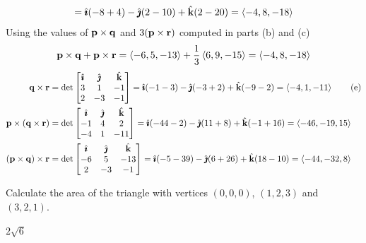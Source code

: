 \begin{solution}
\begin{align*}
=\hat{\pmb{\imath}}(-8+4)-\hat{\pmb{\jmath}}(2-10)
+\hat{\mathbf{k}}(2-20) 
=  \left< -4,8,-18\right> 
\end{align*}
{\phantom{(d)}}
Using the values of $\mathbf{p}\times\mathbf{q}$ and $3(\mathbf{p}\times\mathbf{r})$ computed
in parts (b) and (c)
\begin{equation*}
\mathbf{p}\times\mathbf{q}+\mathbf{p}\times\mathbf{r}=\left< -6,5,-13\right> +\frac{1}{3}\left< 6,9,-15\right> 
 = \left< -4,8,-18\right>
\end{equation*}
\begin{align}
\vq\times\vr 
&= \det\left[\begin{matrix}\hi&\hj&\hk\cr3&1&-1\cr2&-3&-1\end{matrix}\right]
=\hi(-1-3)-\hj(-3+2)
+\hk(-9-2) 
= \llt -4,1,-11\rgt \tag{e} \\
\vp\times(\vq\times\vr)
&= \det\left[\begin{matrix}\hi&\hj&\hk\cr-1&4&2\cr-4&1&-11\end{matrix}\right]
=\hi(-44-2)-\hj(11+8)
+\hk(-1+16) 
= \llt -46,-19,15\rgt \notag \\
%
(\vp\times\vq)\times\vr
&= \det\left[\begin{matrix}\hi&\hj&\hk\cr-6&5&-13\cr2&-3&-1\end{matrix}\right]
=\hi(-5-39)-\hj(6+26)
+\hk(18-10) 
= \llt -44,-32,8\rgt \notag
\end{align}
\reqnomode

\end{solution}

\begin{question}
Calculate the area of the triangle with vertices $(0,0,0)$,
$(1,2,3)$ and $(3,2,1)$.
\end{question}


\begin{answer}
$2\sqrt{6}$
\end{answer}

